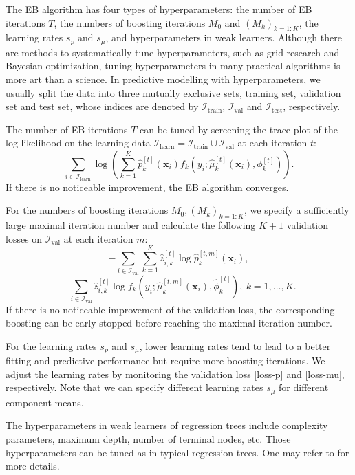 \documentclass[11pt]{article}
\numberwithin{equation}{section}
\def\bx{\boldsymbol{x}}
\begin{document}
The EB algorithm has four types of hyperparameters: the number of EB iterations $T$, the numbers of boosting iterations $M_0$ and $(M_k)_{k=1:K}$, the learning rates $s_p$ and $s_\mu$, and hyperparameters in weak learners. 
Although there are methods to systematically tune hyperparameters, such as grid research and Bayesian optimization, tuning hyperparameters in many practical algorithms is more art than a science.
In predictive modelling with hyperparameters, we usually split the data into three mutually exclusive sets, training set, validation set and test set, whose indices are denoted by $\mathcal{I}_\text{train}$, $\mathcal{I}_\text{val}$ and  $\mathcal{I}_\text{test}$, respectively.

The number of EB iterations $T$ can be tuned by screening the trace plot of the log-likelihood on the learning data $\mathcal{I}_\text{learn}=\mathcal{I}_\text{train}\cup\mathcal{I}_\text{val}$ at each iteration $t$:
$$\sum_{i\in\mathcal{I}_\text{learn}}\log\left(\sum_{k=1}^K\hat{p}_k^{[t]}(\bx_i)f_k\left(y_i;\hat{\mu}_k^{[t]}(\bx_i),\phi_k^{[t]}\right)\right).$$
If there is no noticeable improvement, the EB algorithm converges.

For the numbers of boosting iterations  {$M_0,(M_k)_{k=1:K}$}, we specify a sufficiently large maximal iteration number and calculate the following $K+1$ validation losses on $\mathcal{I}_\text{val}$ at each iteration $m$:
\begin{equation}\label{loss-p}
-\sum_{i\in\mathcal{I}_\text{val}}\sum_{k=1}^K \hat{z}_{i,k}^{[t]}\log \hat{p}_k^{[t,m]}(\bx_i),
\end{equation}
\begin{equation}\label{loss-mu}
-\sum_{i\in\mathcal{I}_\text{val}} \hat{z}^{[t]}_{i,k}\log f_k\left(y_i;\hat{\mu}_k^{[t,m]}\left(\bx_i\right),\hat{\phi}_k^{[t]}\right), ~ k=1,\ldots,K.
\end{equation}
If there is no noticeable improvement of the validation loss, the corresponding boosting can be early stopped before reaching the maximal iteration number.  

For the learning rates {$s_p$} and $s_\mu$, lower learning rates tend to lead to a better fitting and predictive performance but require more boosting iterations.
We adjust the learning rates by monitoring the validation loss \eqref{loss-p} and \eqref{loss-mu}, respectively.
Note that we can specify different learning rates $s_\mu$ for different component means.

The hyperparameters in weak learners of regression trees include complexity parameters, maximum depth, number of terminal nodes, etc.
Those hyperparameters can be tuned as in typical regression trees. One may refer to \citet{hastie2009elements} for more details.
\end{document}
